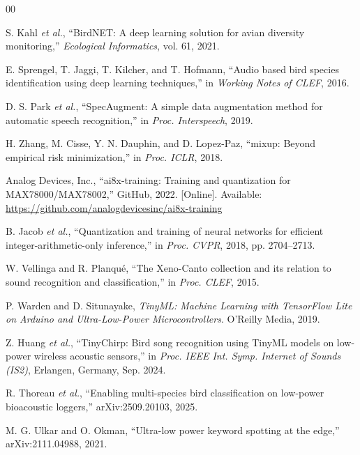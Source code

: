 \documentclass[conference]{IEEEtran}
\begin{document}
\begin{thebibliography}{00}

S. Kahl \textit{et al.}, ``BirdNET: A deep learning solution for avian diversity monitoring,'' \textit{Ecological Informatics}, vol. 61, 2021.

E. Sprengel, T. Jaggi, T. Kilcher, and T. Hofmann, ``Audio based bird species identification using deep learning techniques,'' in \textit{Working Notes of CLEF}, 2016.

D. S. Park \textit{et al.}, ``SpecAugment: A simple data augmentation method for automatic speech recognition,'' in \textit{Proc. Interspeech}, 2019.

H. Zhang, M. Cisse, Y. N. Dauphin, and D. Lopez-Paz, ``mixup: Beyond empirical risk minimization,'' in \textit{Proc. ICLR}, 2018.

Analog Devices, Inc., ``ai8x-training: Training and quantization for MAX78000/MAX78002,'' GitHub, 2022. [Online]. Available: \url{https://github.com/analogdevicesinc/ai8x-training}

B. Jacob \textit{et al.}, ``Quantization and training of neural networks for efficient integer-arithmetic-only inference,'' in \textit{Proc. CVPR}, 2018, pp. 2704--2713.

W. Vellinga and R. Planqu\'{e}, ``The Xeno-Canto collection and its relation to sound recognition and classification,'' in \textit{Proc. CLEF}, 2015.

P. Warden and D. Situnayake, \textit{TinyML: Machine Learning with TensorFlow Lite on Arduino and Ultra-Low-Power Microcontrollers}. O'Reilly Media, 2019.

Z. Huang \textit{et al.}, ``TinyChirp: Bird song recognition using TinyML models on low-power wireless acoustic sensors,'' in \textit{Proc. IEEE Int. Symp. Internet of Sounds (IS2)}, Erlangen, Germany, Sep. 2024.

R. Thoreau \textit{et al.}, ``Enabling multi-species bird classification on low-power bioacoustic loggers,'' arXiv:2509.20103, 2025.

M. G. Ulkar and O. Okman, ``Ultra-low power keyword spotting at the edge,'' arXiv:2111.04988, 2021.

\end{thebibliography}
\end{document}
